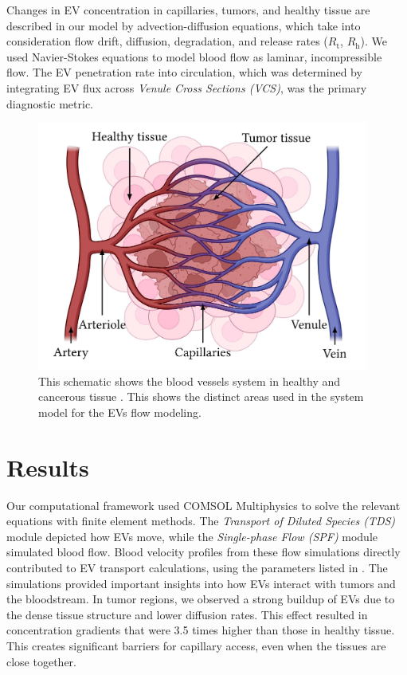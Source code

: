 \documentclass[sigconf]{acmart}
\begin{document}
Changes in EV concentration in capillaries, tumors, and healthy tissue are described in our model by advection-diffusion equations, which take into consideration flow drift, diffusion, degradation, and release rates ($R_{\text{t}}$, $R_{\text{h}}$). We used Navier-Stokes equations to model blood flow as laminar, incompressible flow. The EV penetration rate into circulation, which was determined by integrating EV flux across \textit{Venule Cross Sections (VCS)}, was the primary diagnostic metric.

 \begin{figure}[h]
   \centering
   \includegraphics[width=\linewidth]{pictures/schematic_bloodvessels.png}
   \caption{This schematic shows the blood vessels system in healthy and cancerous tissue \cite{Zoofaghari_2023}. This shows the distinct areas used in the system model for the EVs flow modeling.}
   \Description{}
 \end{figure}

\section{Results}
\label{sec: num-results}
Our computational framework used COMSOL Multiphysics to solve the relevant equations with finite element methods. The \textit{Transport of Diluted Species (TDS)} module depicted how EVs move, while the \textit{Single-phase Flow (SPF)} module simulated blood flow. Blood velocity profiles from these flow simulations directly contributed to EV transport calculations, using the parameters listed in \cite{Zoofaghari_2023}. The simulations provided important insights into how EVs interact with tumors and the bloodstream. In tumor regions, we observed a strong buildup of EVs due to the dense tissue structure and lower diffusion rates. This effect resulted in concentration gradients that were 3.5 times higher than those in healthy tissue. This creates significant barriers for capillary access, even when the tissues are close together. 
\end{document}
